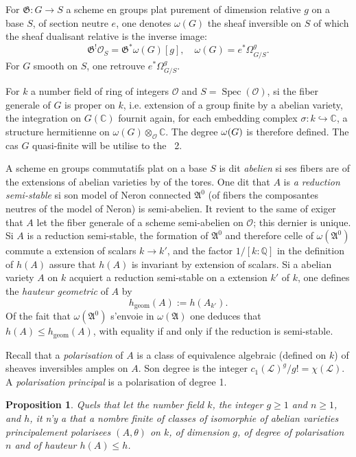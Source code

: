 \documentclass[12pt,a4paper]{article}
\theoremstyle{plain}
\newtheorem{proposition}[theorem]{Proposition}
\theoremstyle{definition}
\theoremstyle{remark}
\DeclareMathOperator{\Spec}{Spec}
\newcommand{\CC}{\mathbb{C}}
\newcommand{\QQ}{\mathbb{Q}}
\newcommand{\cO}{\mathcal{O}}
\newcommand{\cL}{\mathcal{L}}
\newcommand{\fA}{\mathfrak{A}}
\let\deg\relax
\providecommand{\CC}{\mathbb{C}}
\providecommand{\QQ}{\mathbb{Q}}
\providecommand{\cL}{\mathcal{L}}
\providecommand{\cO}{\mathcal{O}}
\providecommand{\fA}{\mathfrak{A}}
\providecommand{\fG}{\mathfrak{G}}
\providecommand{\Spec}{\operatorname{Spec}}
\begin{document}
For $\fG : G \to S$ a scheme en groups plat purement of dimension relative $g$ on a base $S$, of section neutre $e$, one denotes $\omega(G)$ the sheaf inversible on $S$ of which the sheaf dualisant relative is the inverse image:
\[
\fG^! \cO_S = \fG^* \omega(G)[g], \quad \omega(G) = e^* \Omega^g_{G/S}.
\]
For $G$ smooth on $S$, one retrouve $e^* \Omega^g_{G/S}$.

For $k$ a number field of ring of integers $\cO$ and $S = \Spec(\cO)$, si the fiber generale of $G$ is proper on $k$, i.e. extension of a group finite by a abelian variety, the integration on $G(\CC)$ fournit again, for each embedding complex $\sigma : k \hookrightarrow \CC$, a structure hermitienne on $\omega(G) \otimes_{\cO} \CC$. The degree $\deg \omega(G)$ is therefore defined. The cas $G$ quasi-finite will be utilise to the ~2.

A scheme en groups commutatifs plat on a base $S$ is dit \emph{abelien} si ses fibers are of the extensions of abelian varieties by of the tores. One dit that $A$ is \emph{a reduction semi-stable} si son model of Neron connected $\fA^0$ (of fibers the composantes neutres of the model of Neron) is semi-abelien. It revient to the same of exiger that $A$ let the fiber generale of a scheme semi-abelien on $\cO$; this dernier is unique. Si $A$ is a reduction semi-stable, the formation of $\fA^0$ and therefore celle of $\omega(\fA^0)$ commute a extension of scalars $k \to k'$, and the factor $1/[k:\QQ]$ in the definition of $h(A)$ assure that $h(A)$ is invariant by extension of scalars. Si a abelian variety $A$ on $k$ acquiert a reduction semi-stable on a extension $k'$ of $k$, one defines the \emph{hauteur geometric} of $A$ by
\[
h_{\text{geom}}(A) := h(A_{k'}).
\]
Of the fait that $\omega(\fA^0)$ s'envoie in $\omega(\fA)$ one deduces that $h(A) \leq h_{\text{geom}}(A)$, with equality if and only if the reduction is semi-stable.

Recall that a \emph{polarisation} of $A$ is a class of equivalence algebraic (defined on $k$) of sheaves inversibles amples on $A$. Son degree is the integer $c_1(\cL)^g/g! = \chi(\cL)$. A \emph{polarisation principal} is a polarisation of degree 1.

\begin{proposition}
Quels that let the number field $k$, the integer $g \geq 1$ and $n \geq 1$, and $h$, it n'y a that a nombre finite of classes of isomorphie of abelian varieties principalement polarisees $(A,\theta)$ on $k$, of dimension $g$, of degree of polarisation $n$ and of hauteur $h(A) \leq h$.
\end{proposition}
\end{document}
